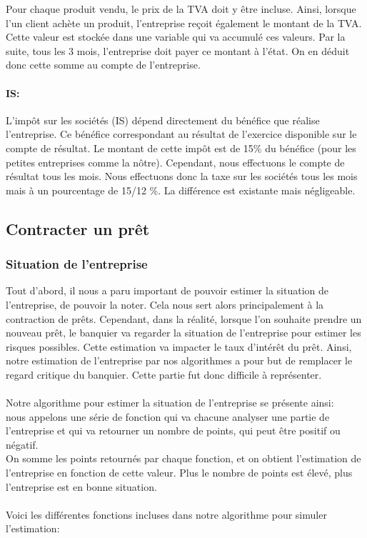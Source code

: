 Pour chaque produit vendu, le prix de la TVA doit y être incluse. Ainsi, lorsque l’un client achète un produit, l’entreprise reçoit également le montant de la TVA. Cette valeur est stockée dans une variable qui va accumulé ces valeurs.
Par la suite, tous les 3 mois, l’entreprise doit payer ce montant à l’état. On en déduit donc cette somme au compte de l’entreprise.



\paragraph{IS:}



L'impôt sur les sociétés (IS) dépend directement du bénéfice que réalise l’entreprise. Ce bénéfice correspondant au résultat de l’exercice disponible sur le compte de résultat. Le montant de cette impôt est de 15\% du bénéfice (pour les petites entreprises comme la nôtre).  Cependant, nous effectuons le compte de résultat tous les mois. Nous effectuons donc la taxe sur les sociétés tous les mois mais à un pourcentage de 15/12 \%. La différence est existante mais négligeable.



\subsection{Contracter un prêt}



\subsubsection{Situation de l’entreprise}



Tout d’abord, il nous a paru important de pouvoir estimer la situation de l’entreprise, de pouvoir la noter. Cela nous sert alors principalement à la contraction de prêts. Cependant, dans la réalité, lorsque l’on souhaite prendre un nouveau prêt, le banquier va regarder la situation de l’entreprise pour estimer les risques possibles. Cette estimation va impacter le taux d'intérêt du prêt. Ainsi, notre estimation de l’entreprise par nos algorithmes a pour but de remplacer le regard critique du banquier. Cette partie fut donc difficile à représenter. \\
\\
Notre algorithme pour estimer la situation de l'entreprise se présente ainsi: \\
nous appelons une série de fonction qui va chacune analyser une partie de l’entreprise et qui va retourner un nombre de points, qui peut être positif ou négatif. \\
On somme les points retournés par chaque fonction, et on obtient l’estimation de l’entreprise en fonction de cette valeur. Plus le nombre de points est élevé, plus l’entreprise est en bonne situation. \\
\\
Voici les différentes fonctions incluses dans notre algorithme pour simuler l’estimation: \\



